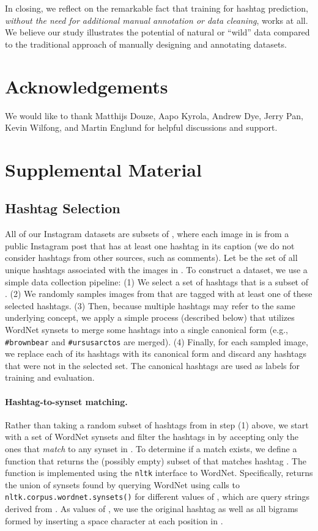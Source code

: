 \documentclass[runningheads]{llncs}
\makeatletter
\newcommand{\eg}{e.g.\@\xspace}
\makeatother
\begin{document}
In closing, we reflect on the remarkable fact that training for hashtag prediction, \emph{without the need for additional manual annotation or data cleaning}, works at all. We believe our study illustrates the potential of natural or ``wild'' data compared to the traditional approach of manually designing and annotating datasets.
 
\section*{Acknowledgements}
We would like to thank Matthijs Douze, Aapo Kyrola, Andrew Dye, Jerry Pan, Kevin Wilfong, and Martin Englund for helpful discussions and support.
 



\appendix
\section{Supplemental Material}
\subsection{Hashtag Selection}
All of our Instagram datasets are subsets of , where each image in  is from a public Instagram post that has at least one hashtag in its caption (we do not consider hashtags from other sources, such as comments). Let  be the set of all unique hashtags associated with the images in . To construct a dataset, we use a simple data collection pipeline: (1) We select a set of hashtags that is a subset of . (2) We randomly samples images from  that are tagged with at least one of these selected hashtags. (3) Then, because multiple hashtags may refer to the same underlying concept, we apply a simple process (described below) that utilizes WordNet \cite{wordnet} synsets to merge some hashtags into a single canonical form (\eg, \texttt{\#brownbear} and \texttt{\#ursusarctos} are merged). (4) Finally, for each sampled image, we replace each of its hashtags with its canonical form and discard any hashtags that were not in the selected set. The canonical hashtags are used as labels for training and evaluation.

\paragraph{Hashtag-to-synset matching.} Rather than taking a random subset of hashtags from  in step (1) above, we start with a set of WordNet synsets  and filter the hashtags in  by accepting only the ones that \emph{match} to any synset in . To determine if a match exists, we define a function  that returns the (possibly empty) subset of  that matches hashtag . The function  is implemented using the \texttt{nltk} interface to WordNet. Specifically,  returns the union of synsets found by querying WordNet using calls to \texttt{nltk.corpus.wordnet.synsets()} for different values of , which are query strings derived from . As values of , we use the original hashtag  as well as all bigrams formed by inserting a space character at each position in .
\end{document}
